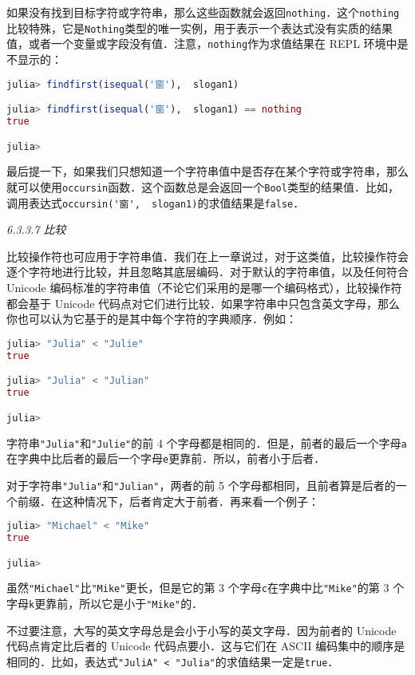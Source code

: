 如果没有找到目标字符或字符串，那么这些函数就会返回\verb|nothing|．这个\verb|nothing|比较特殊，它是\verb|Nothing|类型的唯一实例，用于表示一个表达式没有实质的结果值，或者一个变量或字段没有值．注意，\verb|nothing|作为求值结果在 REPL 环境中是不显示的：
\begin{lstlisting}[language=julia]
julia> findfirst(isequal('窗'),  slogan1) 

julia> findfirst(isequal('窗'),  slogan1) == nothing
true

julia> 
\end{lstlisting}

最后提一下，如果我们只想知道一个字符串值中是否存在某个字符或字符串，那么就可以使用\verb|occursin|函数．这个函数总是会返回一个\verb|Bool|类型的结果值．比如，调用表达式\verb|occursin('窗',  slogan1)|的求值结果是\verb|false|．

\textsl{6.3.3.7 比较}

比较操作符也可应用于字符串值．我们在上一章说过，对于这类值，比较操作符会逐个字符地进行比较，并且忽略其底层编码．对于默认的字符串值，以及任何符合 Unicode 编码标准的字符串值（不论它们采用的是哪一个编码格式），比较操作符都会基于 Unicode 代码点对它们进行比较．如果字符串中只包含英文字母，那么你也可以认为它基于的是其中每个字符的字典顺序．例如：
\begin{lstlisting}[language=julia]
julia> "Julia" < "Julie"
true

julia> "Julia" < "Julian" 
true

julia> 
\end{lstlisting}

字符串\verb|"Julia"|和\verb|"Julie"|的前 4 个字母都是相同的．但是，前者的最后一个字母\verb|a|在字典中比后者的最后一个字母\verb|e|更靠前．所以，前者小于后者．

对于字符串\verb|"Julia"|和\verb|"Julian"|，两者的前 5 个字母都相同，且前者算是后者的一个前缀．在这种情况下，后者肯定大于前者．再来看一个例子：
\begin{lstlisting}[language=julia]
julia> "Michael" < "Mike"
true

julia> 
\end{lstlisting}

虽然\verb|"Michael"|比\verb|"Mike"|更长，但是它的第 3 个字母\verb|c|在字典中比\verb|"Mike"|的第 3 个字母\verb|k|更靠前，所以它是小于\verb|"Mike"|的．

不过要注意，大写的英文字母总是会小于小写的英文字母．因为前者的 Unicode 代码点肯定比后者的 Unicode 代码点要小．这与它们在 ASCII 编码集中的顺序是相同的．比如，表达式\verb|"JuliA" < "Julia"|的求值结果一定是\verb|true|．

